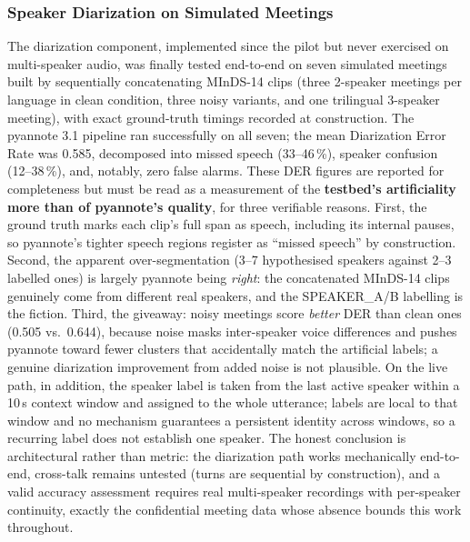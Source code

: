 \documentclass[12pt]{report}
\begin{document}
\subsubsection{Speaker Diarization on Simulated Meetings}
The diarization component, implemented since the pilot but never exercised on multi-speaker audio, was finally tested end-to-end on seven simulated meetings built by sequentially concatenating MInDS-14 clips (three 2-speaker meetings per language in clean condition, three noisy variants, and one trilingual 3-speaker meeting), with exact ground-truth timings recorded at construction. The pyannote 3.1 pipeline ran successfully on all seven; the mean Diarization Error Rate was 0.585, decomposed into missed speech (33--46\,\%), speaker confusion (12--38\,\%), and, notably, zero false alarms.
These DER figures are reported for completeness but must be read as a measurement of the \textbf{testbed's artificiality more than of pyannote's quality}, for three verifiable reasons. First, the ground truth marks each clip's full span as speech, including its internal pauses, so pyannote's tighter speech regions register as \enquote{missed speech} by construction. Second, the apparent over-segmentation (3--7 hypothesised speakers against 2--3 labelled ones) is largely pyannote being \emph{right}: the concatenated MInDS-14 clips genuinely come from different real speakers, and the SPEAKER\_A/B labelling is the fiction. Third, the giveaway: noisy meetings score \emph{better} DER than clean ones (0.505 vs.\ 0.644), because noise masks inter-speaker voice differences and pushes pyannote toward fewer clusters that accidentally match the artificial labels; a genuine diarization improvement from added noise is not plausible. On the live path, in addition, the speaker label is taken from the last active speaker within a 10\,s context window and assigned to the whole utterance; labels are local to that window and no mechanism guarantees a persistent identity across windows, so a recurring label does not establish one speaker. The honest conclusion is architectural rather than metric: the diarization path works mechanically end-to-end, cross-talk remains untested (turns are sequential by construction), and a valid accuracy assessment requires real multi-speaker recordings with per-speaker continuity, exactly the confidential meeting data whose absence bounds this work throughout.
\end{document}
